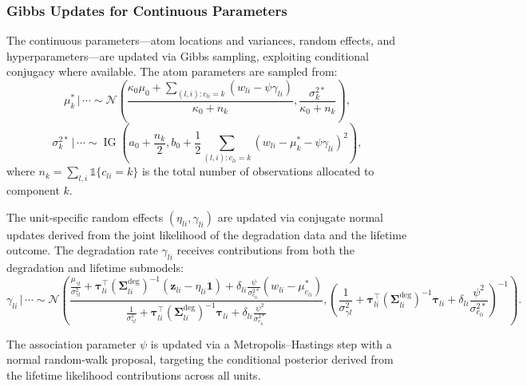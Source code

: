 \documentclass[a4paper,fleqn,longmktitle]{cas-sc}
\DeclareMathOperator{\IG}{IG}
\newcommand{\given}{\,|\,}
\newcommand{\normal}{\mathcal{N}}
\begin{document}
\subsubsection{Gibbs Updates for Continuous Parameters}

The continuous parameters---atom locations and variances, random effects, and hyperparameters---are updated via Gibbs sampling, exploiting conditional conjugacy where available. The atom parameters are sampled from:
\begin{equation}\label{eq:atom_update}
    \mu_k^* \given \cdots \sim \normal\!\left(
        \frac{\kappa_0\mu_0 + \sum_{(l,i):c_{li}=k} (w_{li} - \psi\gamma_{li})}
             {\kappa_0 + n_k},
        \frac{\sigma_k^{2*}}{\kappa_0 + n_k}
    \right),
\end{equation}
\begin{equation}\label{eq:atom_var_update}
    \sigma_k^{2*} \given \cdots \sim \IG\!\left(
        a_0 + \frac{n_k}{2},
        b_0 + \frac{1}{2}\sum_{(l,i):c_{li}=k} (w_{li} - \mu_k^* - \psi\gamma_{li})^2
    \right),
\end{equation}
where $n_k = \sum_{l,i} \mathbb{1}\{c_{li} = k\}$ is the total number of observations allocated to component $k$.

The unit-specific random effects $(\eta_{li}, \gamma_{li})$ are updated via conjugate normal updates derived from the joint likelihood of the degradation data and the lifetime outcome. The degradation rate $\gamma_{li}$ receives contributions from both the degradation and lifetime submodels:
\begin{equation}\label{eq:gamma_gibbs}
    \gamma_{li} \given \cdots \sim \normal\!\left(
        \frac{
            \frac{\mu_{\gamma l}}{\sigma_{\gamma l}^2}
            + \bm{\tau}_{li}^{\top}(\bm{\Sigma}_{li}^{\text{deg}})^{-1}(\bm{z}_{li} - \eta_{li}\bm{1})
            + \delta_{li}\frac{\psi}{\sigma_{c_{li}}^{2*}}(w_{li} - \mu_{c_{li}}^*)
        }{
            \frac{1}{\sigma_{\gamma l}^2}
            + \bm{\tau}_{li}^{\top}(\bm{\Sigma}_{li}^{\text{deg}})^{-1}\bm{\tau}_{li}
            + \delta_{li}\frac{\psi^2}{\sigma_{c_{li}}^{2*}}
        },
        \left(
            \frac{1}{\sigma_{\gamma l}^2}
            + \bm{\tau}_{li}^{\top}(\bm{\Sigma}_{li}^{\text{deg}})^{-1}\bm{\tau}_{li}
            + \delta_{li}\frac{\psi^2}{\sigma_{c_{li}}^{2*}}
        \right)^{-1}
    \right).
\end{equation}

The association parameter $\psi$ is updated via a Metropolis--Hastings step with a normal random-walk proposal, targeting the conditional posterior derived from the lifetime likelihood contributions across all units.
\end{document}
